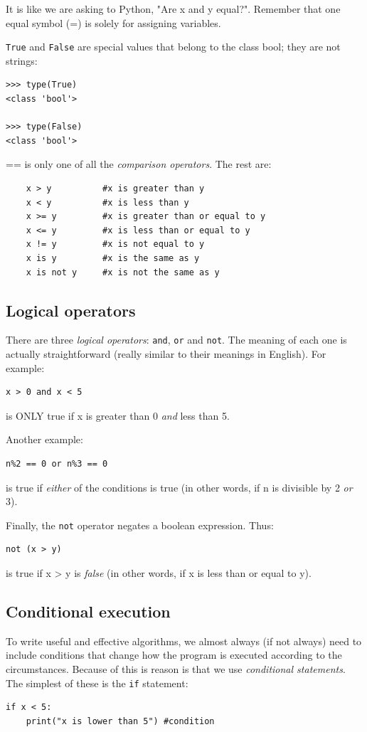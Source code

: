 It is like we are asking to Python, "Are x and y equal?". Remember that one equal symbol (=) is solely for assigning variables.

\texttt{True} and \texttt{False} are special values that belong to the class bool; they are not strings:
\begin{verbatim}
>>> type(True)
<class 'bool'>

>>> type(False)
<class 'bool'>

\end{verbatim}

== is only one of all the \textit{comparison operators}. The rest are:
\begin{verbatim}
    x > y          #x is greater than y
    x < y          #x is less than y
    x >= y         #x is greater than or equal to y
    x <= y         #x is less than or equal to y
    x != y         #x is not equal to y
    x is y         #x is the same as y
    x is not y     #x is not the same as y
\end{verbatim}

\subsection{Logical operators}
There are three \textit{logical operators}: \texttt{and}, \texttt{or} and \texttt{not}. The meaning of each one is actually straightforward (really similar to their meanings in English). For example:
\begin{verbatim}
x > 0 and x < 5
\end{verbatim}
is ONLY true if x is greater than 0 \textit{and} less than 5.

Another example:
\begin{verbatim}
n%2 == 0 or n%3 == 0
\end{verbatim}
is true if \textit{either} of the conditions is true (in other words, if n is divisible by 2 \textit{or} 3).

Finally, the \texttt{not} operator negates a boolean expression. Thus:
\begin{verbatim}
not (x > y)
\end{verbatim}
is true if x > y is \textit{false} (in other words, if x is less than or equal to y).

\subsection{Conditional execution}
To write useful and effective algorithms, we almost always (if not always) need to include conditions that change how the program is executed according to the circumstances. Because of this is reason is that we use \textit{conditional statements}. The simplest of these is the \texttt{if} statement:
\begin{verbatim}
if x < 5:
    print("x is lower than 5") #condition
\end{verbatim}

